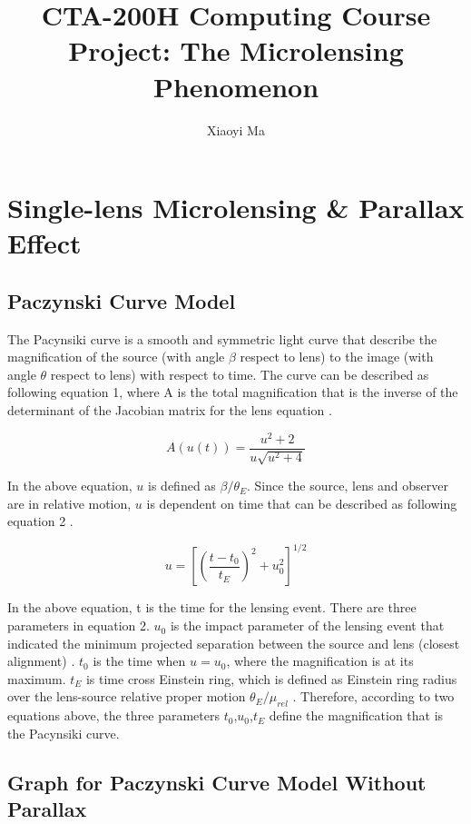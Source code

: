 \documentclass[preprint]{aastex63}
\begin{document}
\title{CTA-200H Computing Course Project: The Microlensing Phenomenon}
\author{Xiaoyi Ma}




\section{Single-lens Microlensing \& Parallax Effect}
\medskip
\subsection{Paczynski Curve Model}

The Pacynsiki curve is a smooth and symmetric light curve that describe the magnification of the source (with angle $\beta$ respect to lens) to the image (with angle $\theta$ respect to lens) with respect to time. The curve can be described as following equation 1, where A is the total magnification that is the inverse of the determinant of the Jacobian matrix for the lens equation \cite{2012ARA&A..50..411G}.

\begin{equation}
    A(u(t)) = \frac{u^2+2}{u\sqrt{u^2+4}}
\end{equation}

In the above equation, $u$ is defined as $\beta/\theta_E$. Since the source, lens and observer are in relative motion, $u$ is dependent on time that can be described as following equation 2 \cite{2012ARA&A..50..411G}.

\begin{equation}
    u=[(\frac{t-t_0}{t_E})^2+u_0^2]^{1/2}
\end{equation}

In the above equation, t is the time for the lensing event. There are three parameters in equation 2. $u_0$ is the impact parameter of the lensing event that indicated the minimum projected separation between the source and lens (closest alignment) \cite{Poleski_2019}. $t_0$ is the time when $u=u_0$, where the magnification is at its maximum. $t_E$ is time cross Einstein ring, which is defined as Einstein ring radius over the lens-source relative proper motion $\theta_E/\mu_{rel}$ \cite{2012ARA&A..50..411G}. Therefore, according to two equations above, the three parameters $t_0$,$u_0$,$t_E$ define the magnification that is the Pacynsiki curve.

\bigskip
\subsection{Graph for Paczynski Curve Model Without Parallax}
\end{document}
